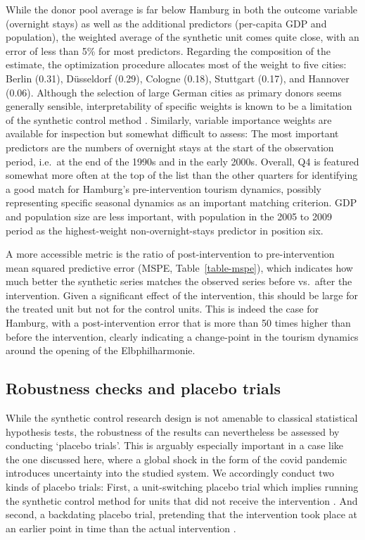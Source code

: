\documentclass[a4paper, 12pt]{article}
\begin{document}
While the donor pool average is far below Hamburg in both the outcome variable (overnight stays) as well as the additional predictors (per-capita GDP and population), the weighted average of the synthetic unit comes quite close, with an error of less than 5\% for most predictors. Regarding the composition of the estimate, the optimization procedure allocates most of the weight to five cities: Berlin (0.31), Düsseldorf (0.29), Cologne (0.18), Stuttgart (0.17), and Hannover (0.06). Although the selection of large German cities as primary donors seems generally sensible, interpretability of specific weights is known to be a limitation of the synthetic control method \citep{abadie2021}. Similarly, variable importance weights are available for inspection but somewhat difficult to assess: The most important predictors are the numbers of overnight stays at the start of the observation period, i.e.\ at the end of the 1990s and in the early 2000s. Overall, Q4 is featured somewhat more often at the top of the list than the other quarters for identifying a good match for Hamburg's pre-intervention tourism dynamics, possibly representing specific seasonal dynamics as an important matching criterion. GDP and population size are less important, with population in the 2005 to 2009 period as the highest-weight non-overnight-stays predictor in position six.

A more accessible metric is the ratio of post-intervention to pre-intervention mean squared predictive error (MSPE, Table~\ref{table-mspe}), which indicates how much better the synthetic series matches the observed series before vs.\ after the intervention. Given a significant effect of the intervention, this should be large for the treated unit but not for the control units. This is indeed the case for Hamburg, with a post-intervention error that is more than 50 times higher than before the intervention, clearly indicating a change-point in the tourism dynamics around the opening of the Elbphilharmonie.


\subsection{Robustness checks and placebo trials}

While the synthetic control research design is not amenable to classical statistical hypothesis tests, the robustness of the results can nevertheless be assessed by conducting `placebo trials'. This is arguably especially important in a case like the one discussed here, where a global shock in the form of the covid pandemic introduces uncertainty into the studied system. We accordingly conduct two kinds of placebo trials: First, a unit-switching placebo trial which implies running the synthetic control method for units that did not receive the intervention \citep{abadie2015}. And second, a backdating placebo trial, pretending that the intervention took place at an earlier point in time than the actual intervention \citep{abadie2021}.
\end{document}
